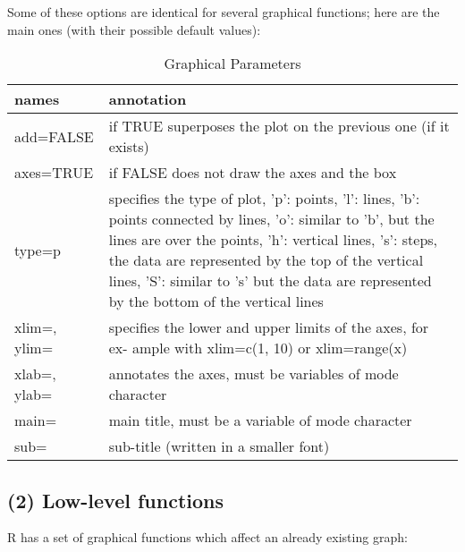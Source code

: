 \documentclass[]{book}
\theoremstyle{definition}
\theoremstyle{definition}
\theoremstyle{definition}
\theoremstyle{remark}
\begin{document}
Some of these options are identical for several graphical functions;
here are the main ones (with their possible default values):

\begin{table}

\caption{\label{tab:unnamed-chunk-109}Graphical Parameters}
\centering
\begin{tabular}[t]{l|l}
\hline
names & annotation\\
\hline
add=FALSE & if TRUE superposes the plot on the previous one (if it exists)\\
\hline
axes=TRUE & if FALSE does not draw the axes and the box\\
\hline
type=p & specifies the type of plot, 'p': points, 'l': lines, 'b': points connected by lines, 'o': similar to 'b', but the lines are over the points, 'h': vertical lines, 's': steps, the data are represented by the top of the vertical lines, 'S': similar to 's' but the data are represented by the bottom of the vertical lines\\
\hline
xlim=, ylim= & specifies the lower and upper limits of the axes, for ex- ample with xlim=c(1, 10) or xlim=range(x)\\
\hline
xlab=, ylab= & annotates the axes, must be variables of mode character\\
\hline
main= & main title, must be a variable of mode character\\
\hline
sub= & sub-title (written in a smaller font)\\
\hline
\end{tabular}
\end{table}

\subsection{(2) Low-level functions}\label{low-level-functions}

R has a set of graphical functions which affect an already existing
graph:
\end{document}
